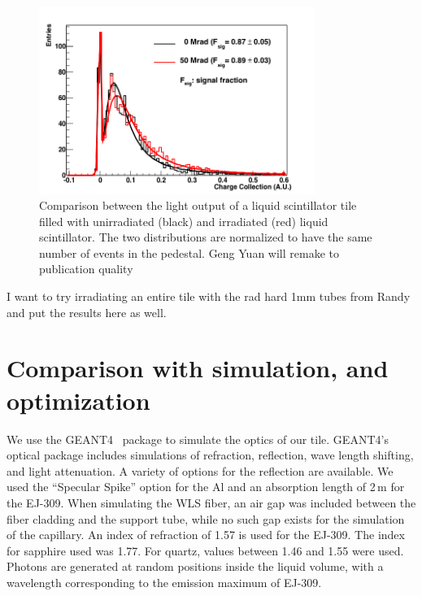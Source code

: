 \documentclass[review]{elsarticle}
\begin{document}
\begin{figure}[!ht]
\begin{center}
\includegraphics[width=0.8\textwidth]{./figures/RD_R7600_1_0_DBF_ALM_GRS_TH450_100814_all_1.png}
\caption{Comparison between the light output of a liquid scintillator
  tile filled with unirradiated (black) and irradiated (red) liquid
  scintillator. The two distributions are normalized to have the same
  number of events in the pedestal.{\color{red} Geng Yuan will remake to publication quality}}
\label{fig:ej309_irradiated}
\end{center}
\end{figure}

{\Large\color{red} I want to try irradiating an entire tile with the rad hard 1mm tubes from Randy and put the results here as well.}

\section{Comparison with simulation, and optimization}
We use the GEANT4~\cite{Agostinelli2003250} package to simulate the
optics of our tile. GEANT4's optical package includes simulations of
refraction, reflection, wave length shifting, and light attenuation.
A variety of options for the reflection are available. We used the
``Specular Spike'' option for the Al and an absorption length of 2\,m for
the EJ-309. When simulating the WLS fiber, an air gap was included
between the fiber cladding and the support tube, while no such gap
exists for the simulation of the capillary. An index of refraction of
1.57 is used for the EJ-309. The index for sapphire used was 1.77.
For quartz, values between 1.46 and 1.55 were used. Photons are
generated at random positions inside the liquid volume, with a
wavelength corresponding to the emission maximum of EJ-309.
\end{document}
